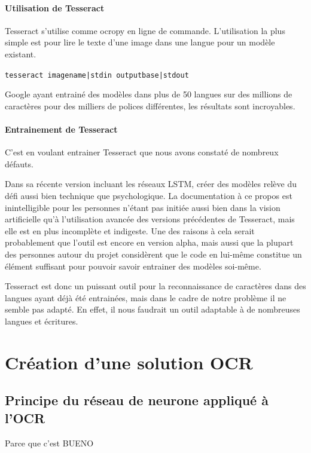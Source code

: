 \documentclass{report}
\begin{document}
\subsubsection{Utilisation de Tesseract}

Tesseract s'utilise comme ocropy en ligne de commande.
L'utilisation la plus simple est pour lire le texte d'une image dans une langue pour un modèle existant.

\texttt{tesseract imagename|stdin outputbase|stdout}

Google ayant entrainé des modèles dans plus de 50 langues sur des millions de caractères pour des milliers de polices différentes, les résultats sont incroyables.

\subsubsection{Entrainement de Tesseract}

C'est en voulant entrainer Tesseract que nous avons constaté de nombreux défauts.

Dans sa récente version incluant les réseaux LSTM, créer des modèles relève du défi aussi bien technique que psychologique.
La documentation à ce propos est inintelligible pour les personnes n'étant pas initiée aussi bien dans la vision artificielle qu'à l'utilisation avancée des versions précédentes de Tesseract, mais elle est en plus incomplète et indigeste.
Une des raisons à cela serait probablement que l'outil est encore en version alpha, mais aussi que la plupart des personnes autour du projet considèrent que le code en lui-même constitue un élément suffisant pour pouvoir savoir entrainer des modèles soi-même.

Tesseract est donc un puissant outil pour la reconnaissance de caractères dans des langues ayant déjà été entrainées, mais dans le cadre de notre problème il ne semble pas adapté.
En effet, il nous faudrait un outil adaptable à de nombreuses langues et écritures.

\chapter{Création d'une solution OCR}

\section{Principe du réseau de neurone appliqué à l'OCR}

Parce que c'est BUENO

\appendix
\end{document}
